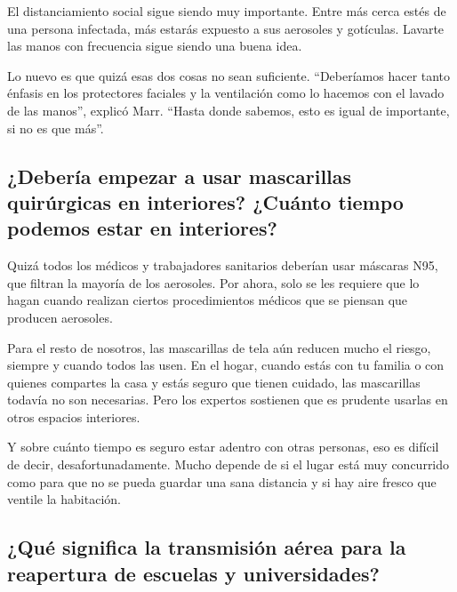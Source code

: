 El distanciamiento social sigue siendo muy importante. Entre más cerca
estés de una persona infectada, más estarás expuesto a sus aerosoles y
gotículas. Lavarte las manos con frecuencia sigue siendo una buena idea.

Lo nuevo es que quizá esas dos cosas no sean suficiente. ``Deberíamos
hacer tanto énfasis en los protectores faciales y la ventilación como lo
hacemos con el lavado de las manos'', explicó Marr. ``Hasta donde
sabemos, esto es igual de importante, si no es que más''.

\hypertarget{deberuxeda-empezar-a-usar-mascarillas-quiruxfargicas-en-interiores-cuuxe1nto-tiempo-podemos-estar-en-interiores}{%
\subsection{¿Debería empezar a usar mascarillas quirúrgicas en
interiores? ¿Cuánto tiempo podemos estar en
interiores?}\label{deberuxeda-empezar-a-usar-mascarillas-quiruxfargicas-en-interiores-cuuxe1nto-tiempo-podemos-estar-en-interiores}}

Quizá todos los médicos y trabajadores sanitarios deberían usar máscaras
N95, que filtran la mayoría de los aerosoles. Por ahora, solo se les
requiere que lo hagan cuando realizan ciertos procedimientos médicos que
se piensan que producen aerosoles.

Para el resto de nosotros, las mascarillas de tela aún reducen mucho el
riesgo, siempre y cuando todos las usen. En el hogar, cuando estás con
tu familia o con quienes compartes la casa y estás seguro que tienen
cuidado, las mascarillas todavía no son necesarias. Pero los expertos
sostienen que es prudente usarlas en otros espacios interiores.

Y sobre cuánto tiempo es seguro estar adentro con otras personas, eso es
difícil de decir, desafortunadamente. Mucho depende de si el lugar está
muy concurrido como para que no se pueda guardar una sana distancia y si
hay aire fresco que ventile la habitación.

\hypertarget{quuxe9-significa-la-transmisiuxf3n-auxe9rea-para-la-reapertura-de-escuelas-y-universidades}{%
\subsection{¿Qué significa la transmisión aérea para la reapertura de
escuelas y
universidades?}\label{quuxe9-significa-la-transmisiuxf3n-auxe9rea-para-la-reapertura-de-escuelas-y-universidades}}

